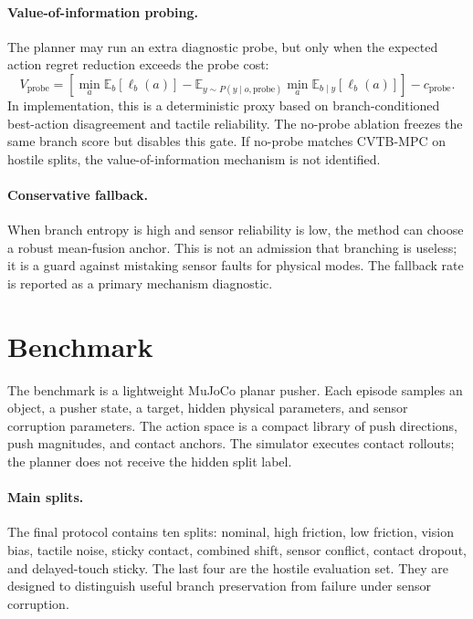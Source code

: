 \documentclass{article}
\newcommand{\method}{\textsc{CVTB-MPC}}
\newcommand{\obs}{o}
\newcommand{\act}{a}
\begin{document}
\paragraph{Value-of-information probing.}
The planner may run an extra diagnostic probe, but only when the expected action regret reduction exceeds the probe cost:
\begin{equation}
  V_{\mathrm{probe}} =
  \left[
    \min_{\act}\mathbb{E}_{b}[\ell_b(\act)]
    -
    \mathbb{E}_{y\sim P(y\mid \obs,\mathrm{probe})}
    \min_{\act}\mathbb{E}_{b\mid y}[\ell_b(\act)]
  \right]
  -c_{\mathrm{probe}}.
\end{equation}
In implementation, this is a deterministic proxy based on branch-conditioned best-action disagreement and tactile reliability. The no-probe ablation freezes the same branch score but disables this gate. If no-probe matches \method{} on hostile splits, the value-of-information mechanism is not identified.

\paragraph{Conservative fallback.}
When branch entropy is high and sensor reliability is low, the method can choose a robust mean-fusion anchor. This is not an admission that branching is useless; it is a guard against mistaking sensor faults for physical modes. The fallback rate is reported as a primary mechanism diagnostic.

\section{Benchmark}

The benchmark is a lightweight MuJoCo planar pusher. Each episode samples an object, a pusher state, a target, hidden physical parameters, and sensor corruption parameters. The action space is a compact library of push directions, push magnitudes, and contact anchors. The simulator executes contact rollouts; the planner does not receive the hidden split label.

\paragraph{Main splits.}
The final protocol contains ten splits: nominal, high friction, low friction, vision bias, tactile noise, sticky contact, combined shift, sensor conflict, contact dropout, and delayed-touch sticky. The last four are the hostile evaluation set. They are designed to distinguish useful branch preservation from failure under sensor corruption.
\end{document}

